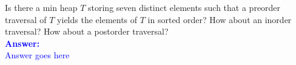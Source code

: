\item{}
Is there a min heap $T$ storing seven distinct elements such that a preorder
traversal of $T$ yields the elements of $T$ in sorted order? How about an
inorder traversal? How about a postorder traversal?\\[12pt]
\ifanswers
\textcolor{blue}{
\textbf{Answer:}\\[6pt]
Answer goes here
}
\newpage
\fi
